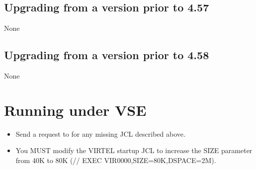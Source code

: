 \documentclass[letterpaper,10pt,english]{sphinxmanual}
\begin{document}

\section{Upgrading from a version prior to 4.57}
\label{\detokenize{Migration_Guide:upgrading-from-a-version-prior-to-4-57}}\label{\detokenize{Migration_Guide:index-7}}
None


\section{Upgrading from a version prior to 4.58}
\label{\detokenize{Migration_Guide:upgrading-from-a-version-prior-to-4-58}}
None

\newpage


\chapter{Running under VSE}
\label{\detokenize{Migration_Guide:running-under-vse}}\label{\detokenize{Migration_Guide:index-8}}\begin{itemize}
\item {} 
Send a request to  for any missing JCL described above.

\item {} 
You MUST modify the VIRTEL startup JCL to increase the SIZE parameter from 40K to 80K (// EXEC VIR0000,SIZE=80K,DSPACE=2M).

\end{itemize}

\newpage

\end{document}
